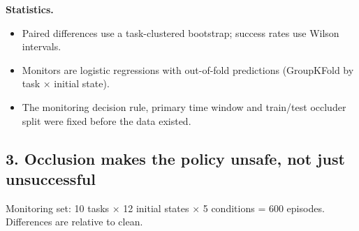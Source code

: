 \documentclass[
  10pt,
]{article}
\providecommand{\tightlist}{%
  \setlength{\itemsep}{0pt}\setlength{\parskip}{0pt}}
\begin{document}
\textbf{Statistics.}

\begin{itemize}
\tightlist
\item
  Paired differences use a task-clustered bootstrap; success rates use
  Wilson intervals.
\item
  Monitors are logistic regressions with out-of-fold predictions
  (GroupKFold by task × initial state).
\item
  The monitoring decision rule, primary time window and train/test
  occluder split were fixed before the data existed.
\end{itemize}

\hypertarget{occlusion-makes-the-policy-unsafe-not-just-unsuccessful}{%
\subsection{3. Occlusion makes the policy unsafe, not just
unsuccessful}\label{occlusion-makes-the-policy-unsafe-not-just-unsuccessful}}

Monitoring set: 10 tasks × 12 initial states × 5 conditions = 600
episodes. Differences are relative to clean.
\end{document}
